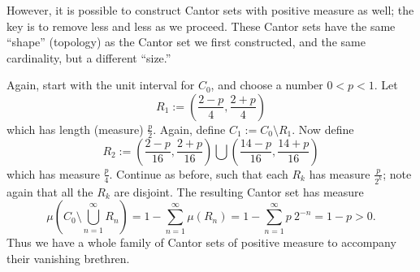 \documentclass{article}
\newcommand{\defined}{:=}
\begin{document}
However, it is possible to construct Cantor sets with positive 
measure as well; the key is to remove less and less as we proceed.  These Cantor sets have the same ``shape'' (topology) as the 
Cantor set we first constructed, and the same cardinality, but a different ``size.''

Again, start with the unit interval for $C_0$, and choose a number $0 < p < 1$.  Let
\begin{equation}
R_1 \defined \left(\frac{2-p}{4},\frac{2+p}{4}\right)
\end{equation}
which has length (measure) $\frac{p}{2}$.  Again, define $C_1 \defined C_0 \setminus R_1$.  Now define
\begin{equation}
R_2 \defined \left(\frac{2-p}{16},\frac{2+p}{16}\right) \bigcup \left(\frac{14-p}{16},\frac{14+p}{16}\right)
\end{equation}
which has measure $\frac{p}{4}$.  Continue as before, such that each $R_k$ has measure $\frac{p}{2^k}$; note again that all the 
$R_k$ are disjoint.  The resulting Cantor set has measure
\begin{equation*}
\mu\left(C_0 \setminus \bigcup_{n=1}^{\infty}R_n \right) = 1 - \sum_{n=1}^{\infty} \mu(R_n) = 1 - \sum_{n=1}^{\infty} p\ 2^{-n} = 1-p > 0.
\end{equation*}
Thus we have a whole family of Cantor sets of positive measure to accompany their vanishing brethren.

\end{document}
